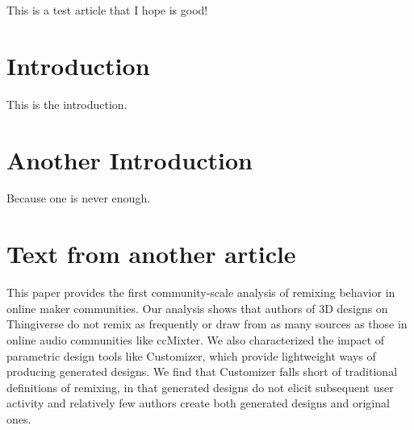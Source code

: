 This is a test article that I hope is good!
 
 
\section{Introduction}

    This is the introduction.

\section{Another Introduction}

    Because one is never enough.
  
\section{Text from another article}
    This paper provides the first community-scale analysis of remixing behavior in online maker communities. Our analysis shows that authors of 3D designs on Thingiverse do not remix as frequently or draw from as many sources as those in online audio communities like ccMixter. We also characterized the impact of parametric design tools like Customizer, which provide lightweight ways of producing generated designs. We find that Customizer falls short of traditional definitions of remixing, in that generated designs do not elicit subsequent user activity and relatively few authors create both generated designs and original ones.